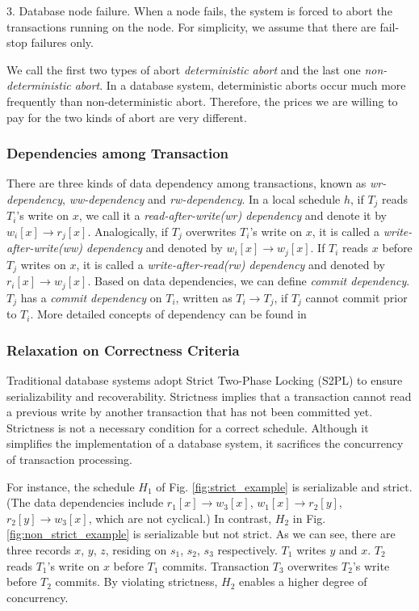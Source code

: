 \documentclass[conference]{IEEEtran}
\begin{document}
3. Database node failure.
When a node fails, the system is forced to abort the transactions running on the node. For simplicity, we assume that there are fail-stop failures only.

We call the first two types of abort \emph{deterministic abort} and the last one \emph{non-deterministic abort}.
In a database system, deterministic aborts occur much more frequently than non-deterministic abort.
Therefore, the prices we are willing to pay for the two kinds of abort are very different.

\subsubsection{Dependencies among Transaction}

There are three kinds of data dependency among transactions, known as
\emph{wr-dependency},
\emph{ww-dependency}
and \emph{rw-dependency}.
In a local schedule ${h}$, if ${T_j}$ reads ${T_i}$'s write on ${x}$,
we call it a \emph{read-after-write(wr) dependency} and denote it by ${w_i[x] \rightarrow r_j[x]}$.
Analogically, if ${T_j}$ overwrites ${T_i}$'s write on ${x}$, it is called a \emph{write-after-write(ww) dependency} and denoted by ${w_i[x] \rightarrow w_j[x]}$.
If ${T_i}$ reads ${x}$ before ${T_j}$ writes on ${x}$, it is called a \emph{write-after-read(rw) dependency} and denoted by ${r_i[x] \rightarrow w_j[x]}$.
Based on data dependencies, we can define \emph{commit dependency}. ${T_j}$ has a \emph{commit dependency} on ${T_i}$, written as ${T_i \rightarrow T_j}$, if ${T_j}$ cannot commit prior to ${T_i}$.
More detailed concepts of dependency can be found in \cite{Dependency:conf/sigmod/ChrysanthisR90} \cite{Dependency:conf/sigmod/BilirisDGJR94}

\subsubsection{Relaxation on Correctness Criteria}

Traditional database systems adopt Strict Two-Phase Locking (S2PL) \cite{DBLP:conf/vldb/Raz92} to ensure serializability and recoverability.
Strictness implies that a transaction cannot read a previous write by another transaction that has not been committed yet.
Strictness is not a necessary condition for a correct schedule.
Although it simplifies the implementation of a database system, it sacrifices the concurrency of transaction processing.

For instance, the schedule ${H_1}$ of Fig. \ref{fig:strict_example} is serializable and strict.
(The data dependencies include ${r_1[x] \rightarrow w_3[x]}$, ${w_1[x] \rightarrow r_2[y]}$, ${r_2[y] \rightarrow w_3[x]}$, which are not cyclical.)
In contrast, ${H_2}$ in Fig. \ref{fig:non_strict_example} is serializable but not strict.
As we can see, there are three records ${x}$, ${y}$, ${z}$, residing on ${s_1}$, ${s_2}$, ${s_3}$ respectively.
${T_1}$ writes ${y}$ and ${x}$.
${T_2}$ reads ${T_1}$'s write on ${x}$ before ${T_1}$ commits.
Transaction ${T_3}$ overwrites ${T_2}$'s write before ${T_2}$ commits.
By violating strictness, ${H_2}$  enables a higher degree of concurrency.
\end{document}
